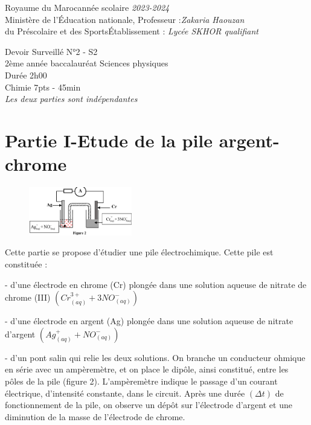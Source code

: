 \documentclass[12pt]{article}
\newcommand\headerMe[2]{\noindent{}#1\hfill#2}
\begin{document}
\headerMe{Royaume du Maroc}{année scolaire \emph{2023-2024}}\\
\headerMe{Ministère de l'Éducation nationale, }{  Professeur :\emph{Zakaria Haouzan}}\\
\headerMe{du Préscolaire et des Sports}{Établissement : \emph{Lycée SKHOR qualifiant}}\\
\begin{center}
Devoir Surveillé  N°2 - S2 \\
    2ème année baccalauréat Sciences physiques\\
Durée 2h00
\\
    \vspace{.2cm}
\hrulefill
\Large{Chimie 7pts - 45min}
\hrulefill\\

    \emph{Les deux parties sont indépendantes}
\end{center}

 \section*{Partie I-Etude de la pile argent-chrome}
\begin{figure}
	\vspace{-2.5cm}
\begin{center}
  \includegraphics[width=0.4\textwidth]{./img/pileex_5.png}
\end{center}
\end{figure}

Cette partie se propose d’étudier une pile électrochimique.
Cette pile est constituée :

- d’une électrode en chrome (Cr) plongée dans
une solution aqueuse de nitrate de chrome (III) $(Cr^{3+}_{(aq)} + 3NO^-_{(aq)})$

- d’une électrode en argent (Ag) plongée dans
une solution aqueuse de nitrate d’argent $(Ag^+_{(aq)} + NO^-_{(aq)}) $

- d’un pont salin qui relie les deux solutions.
On branche un conducteur ohmique en série avec
un ampèremètre, et on place le dipôle, ainsi constitué, entre les pôles de la pile (figure 2).
L’ampèremètre indique le passage d’un courant électrique, d’intensité constante, dans le circuit.
Après une durée $(\Delta{t})$
de fonctionnement de la pile, on observe un dépôt sur l’électrode d’argent et une
diminution de la masse de l’électrode de chrome.
\end{document}
